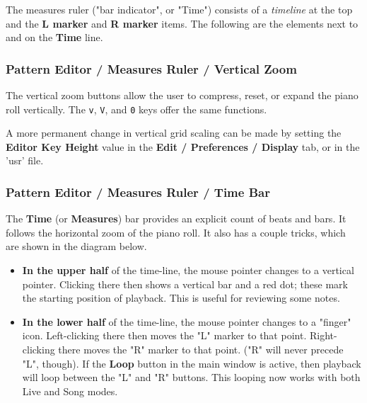    The measures ruler ("bar indicator", or "Time")
   consists of a \textsl{timeline} at the top and the 
   \textbf{L marker} and \textbf{R marker} items.
   The following are the elements next to and on
   the \textbf{Time} line.

\subsubsection{Pattern Editor / Measures Ruler / Vertical Zoom}
\label{subsubsec:pattern_editor_measures_ruler_vertical_zoom}

   The vertical zoom buttons
   allow the user to compress, reset, or expand the
   piano roll vertically.
   The \texttt{v}, \texttt{V}, and \texttt{0} keys offer
   the same functions.

   A more permanent change in vertical grid scaling
   can be made by setting the \textbf{Editor Key Height} value in
   the \textbf{Edit / Preferences / Display} tab,
   or in the 'usr' file.

\subsubsection{Pattern Editor / Measures Ruler / Time Bar}
\label{subsubsec:pattern_editor_measures_ruler_time_bar}

      The \textbf{Time} (or \textbf{Measures}) bar provides an explicit
      count of beats and bars.
      It follows the horizontal zoom of the piano roll.
      It also has a couple tricks, which are shown in the diagram below.

      \begin{itemize}
         \item \textbf{In the upper half} of the time-line,
            the mouse pointer changes to a vertical pointer.
            Clicking there then shows a vertical bar and a red dot; these mark
            the starting position of playback.
            This is useful for reviewing some notes.
         \item \textbf{In the lower half} of the time-line,
            the mouse pointer changes to a "finger" icon.
            Left-clicking there then moves the "L" marker to that point.
            Right-clicking there moves the "R" marker to that point.
            ("R" will never precede "L", though).
            If the \textbf{Loop} button in the main window is active, then
            playback will loop between the "L" and "R" buttons.
            This looping now works with both Live and Song modes.
      \end{itemize}


